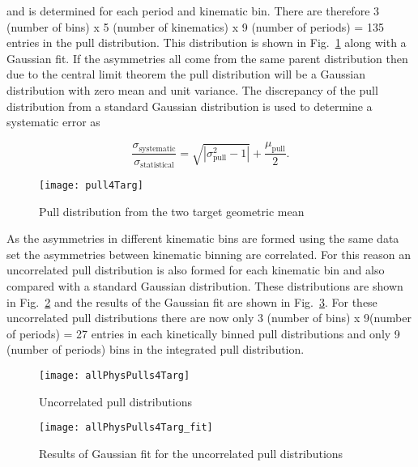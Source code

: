 \noindent
and is determined for each period and kinematic bin.  There are therefore 3
(number of bins) x 5 (number of kinematics) x 9 (number of periods) = 135
entries in the pull distribution. This distribution is shown in
Fig.~\ref{fig::pull4Targ} along with a Gaussian fit.  If the asymmetries all
come from the same parent distribution then due to the central limit theorem the
pull distribution will be a Gaussian distribution with zero mean and unit
variance.  The discrepancy of the pull distribution from a standard Gaussian
distribution is used to determine a systematic error as

\begin{equation}
  \label{equ::sysErrorPull}
  \frac{\sigma_{\mathrm{systematic}}}{\sigma_{\mathrm{statistical}}} =
  \sqrt{|\sigma^2_{\mathrm{pull}} - 1|} + \frac{\mu_{\mathrm{pull}}}{2}.
\end{equation}

\begin{figure}[h!t]
  \begin{center}
    \texttt{[image: pull4Targ]}
    \caption{Pull distribution from the two target geometric mean}
    \label{fig::pull4Targ}
  \end{center}
\end{figure}

\noindent
As the asymmetries in different kinematic bins are formed using the same data
set the asymmetries between kinematic binning are correlated.  For this reason
an uncorrelated pull distribution is also formed for each kinematic bin and also
compared with a standard Gaussian distribution.  These distributions are shown
in Fig.~\ref{fig::allPhysPulls4Targ} and the results of the Gaussian fit are
shown in Fig.~\ref{fig::allPhysPulls4Targ_fit}.  For these uncorrelated pull
distributions there are now only 3 (number of bins) x 9(number of periods) = 27
entries in each kinetically binned pull distributions and only 9 (number of
periods) bins in the integrated pull distribution.

\begin{figure}[h!t]
  \begin{center}
    \texttt{[image: allPhysPulls4Targ]}
    \caption{Uncorrelated pull distributions}
    \label{fig::allPhysPulls4Targ}
  \end{center}
\end{figure}

\begin{figure}[h!t]
  \begin{center}
    \texttt{[image: allPhysPulls4Targ\_fit]}
    \caption{Results of Gaussian fit for the uncorrelated pull distributions}
    \label{fig::allPhysPulls4Targ_fit}
  \end{center}
\end{figure}

